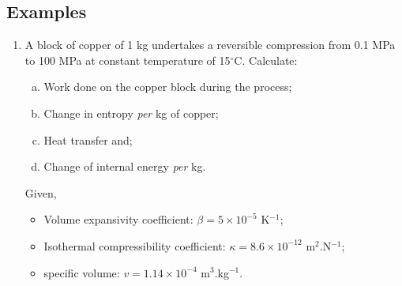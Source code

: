 \documentclass[12pts,a4paper,amsmath,amssymb,floatfix]{article}%
\begin{document}
\clearpage

\subsection{Examples}

\begin{enumerate}[1)]
\item\label{Mod03Ex01} A block of copper of 1 kg undertakes a reversible compression from 0.1 MPa to 100 MPa at constant temperature of 15$^{\circ}$C. Calculate:
    \begin{enumerate}[a)]
       \item Work done on the copper block during the process;
       \item Change in entropy {\it per} kg of copper;
       \item Heat transfer and;
       \item Change of internal energy {\it per} kg.
    \end{enumerate}
    Given, 
    \begin{itemize}
       \item Volume expansivity coefficient: $\beta = 5\times 10^{-5}$ K$^{-1}$;
       \item Isothermal compressibility coefficient: $\kappa = 8.6\times 10^{-12}$ m$^{2}$.N$^{-1}$;
       \item specific volume: $v=1.14\times 10^{-4}$ m$^{3}$.kg$^{-1}$.
    \end{itemize} 


\end{enumerate}
\end{document}
